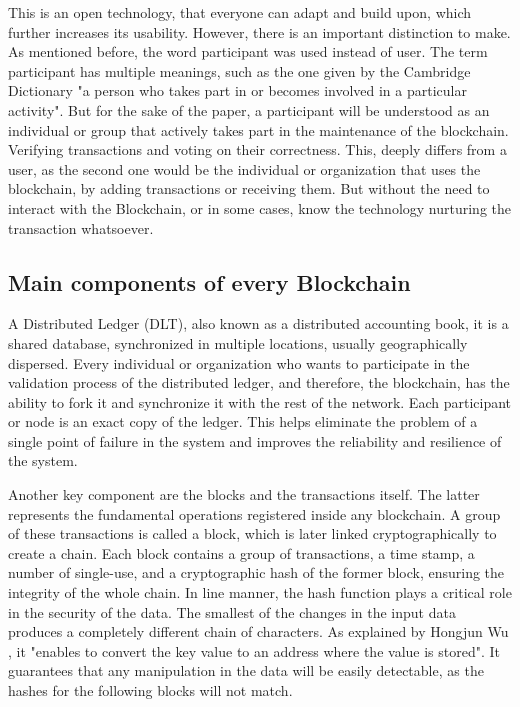 This is an open technology, that everyone can adapt and build upon, which further increases its usability. However, there is an important distinction to make. As mentioned before, the word participant was used instead of user. The term participant has multiple meanings, such as the one given by the Cambridge Dictionary \cite{participantDefinition} "a person who takes part in or becomes involved in a particular activity". But for the sake of the paper, a participant will be understood as an individual or group that actively takes part in the maintenance of the blockchain. Verifying transactions and voting on their correctness. This, deeply differs from a user, as the second one would be the individual or organization that uses the blockchain, by adding transactions or receiving them. But without the need to interact with the Blockchain, or in some cases, know the technology nurturing the transaction whatsoever.

\subsection{Main components of every Blockchain}
\label{mainComponents}

A Distributed Ledger (DLT), also known as a distributed accounting book, it is a shared database, synchronized in multiple locations, usually geographically dispersed. Every individual or organization who wants to participate in the validation process of the distributed ledger, and therefore, the blockchain, has the ability to fork it and synchronize it with the rest of the network. 
Each participant or node is an exact copy of the ledger. This helps eliminate the problem of a single point of failure in the system and improves the reliability and resilience of the system. 

Another key component are the blocks and the transactions itself. The latter represents the fundamental operations registered inside any blockchain. A group of these transactions is called a block, which is later linked cryptographically to create a chain. Each block contains a group of transactions, a time stamp, a number of single-use, and a cryptographic hash of the former block, ensuring the integrity of the whole chain. In line manner, the hash function plays a critical role in the security of the data. The smallest of the changes in the input data produces a completely different chain of characters. As explained by Hongjun Wu \cite{hashFunctionDefinition}, it "enables to convert the key value to an address where the value is stored". It guarantees that any manipulation in the data will be easily detectable, as the hashes for the following blocks will not match. 

